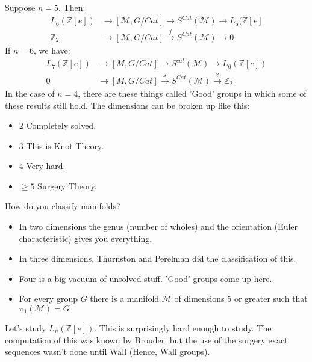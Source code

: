 \documentclass[crop=false,class=article,oneside]{standalone}
\begin{document}
        Suppose $n=5$. Then:
        \begin{align*}
            L_{6}(\mathbb{Z}[e])
            &\rightarrow[\mathcal{M},G/Cat]
            \rightarrow{S^{Cat}}(\mathcal{M})
            \rightarrow{L_{5}}(\mathbb{Z}[e]\\
            \mathbb{Z}_{2}&\rightarrow
            [\mathcal{M},G/Cat]
            \overset{f}{\rightarrow}S^{Cat}(\mathcal{M})
            \rightarrow{0}
        \end{align*}
        If $n=6$, we have:
        \begin{align*}
            L_{7}(\mathbb{Z}[e])
            &\rightarrow[M,G/Cat]\rightarrow
            S^{cat}(\mathcal{M})\rightarrow L_{6}(\mathbb{Z}[e])\\
            0&\rightarrow [M,G/Cat]
            \overset{g}{\rightarrow}S^{Cat}(\mathcal{M})
            \overset{?}{\rightarrow}\mathbb{Z}_{2}
        \end{align*}
        In the case of $n=4$, there are these
        things called 'Good' groups in which some
        of these results still hold. The
        dimensions can be broken up like this:
        \begin{itemize}
            \item $2$ Completely solved.
            \item $3$ This is Knot Theory.
            \item $4$ Very hard.
            \item $\geq 5$ Surgery Theory.
        \end{itemize}
        How do you classify manifolds?
        \begin{itemize}
            \item In two dimensions the genus
                  (number of wholes) and the
                  orientation (Euler characteristic)
                  gives you everything.
            \item In three dimensions, Thurnston and
                  Perelman did the classification of this.
            \item Four is a big vacuum of unsolved
                  stuff. 'Good' groups come up here.
            \item For every group $G$ there is a
                  manifold $\mathcal{M}$ of dimensions
                  $5$ or greater such that
                  $\pi_{1}(\mathcal{M})=G$
        \end{itemize}
        Let's study $L_{n}(\mathbb{Z}[e])$.
        This is surprisingly hard enough to study.
        The computation of this was known by Brouder,
        but the use of the surgery exact sequences
        wasn't done until Wall (Hence, Wall groups).
\end{document}
